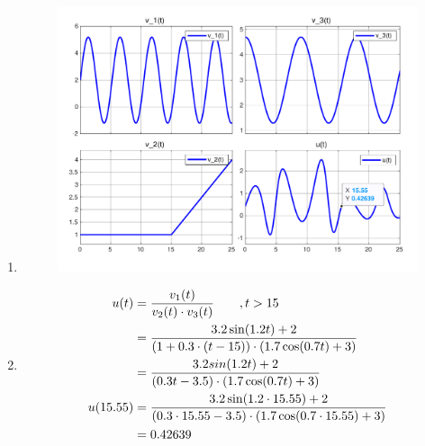 \documentclass[answers,11pt]{exam}
\begin{document}
\begin{enumerate}[label=\alph*)]
\begin{tcolorbox}
\begin{enumerate}[label=g\arabic*)]
      \item
            \parbox{\textwidth}{
              \begin{figure}[H]
                \centering
                \hspace{0mm}\scalebox{0.50}
                {\includegraphics{figurer/g2.pdf}}
                \label{fig:2g2}
              \end{figure}
            }
      \item
            \begin{align}
              u(t)     & = \frac{ v_1(t)}{v_2(t) \cdot v_3(t)} \qquad , t > 15 \notag                                               \\
                       & = \frac{3.2 \sin (1.2t)+2}{(1+0.3 \cdot (t-15)) \cdot (1.7 \cos (0.7t)+3)} \notag                          \\
                       & = \frac{3.2sin(1.2t)+2}{(0.3t-3.5)\cdot (1.7\cos (0.7t)+3)} \notag                                         \\
              u(15.55) & = \frac{3.2 \sin (1.2 \cdot 15.55)+2}{(0.3 \cdot 15.55 - 3.5) \cdot (1.7 \cos (0.7 \cdot 15.55)+3)} \notag \\
                       & = 0.42639
            \end{align}
    \end{enumerate}

  \end{tcolorbox}

  \newpage
  


\end{enumerate}
\end{document}

